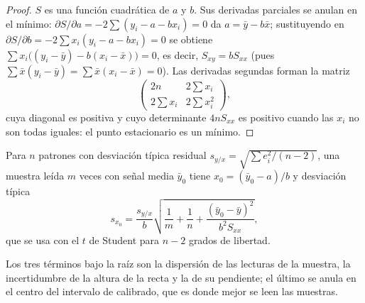 \begin{proof}
$S$ es una función cuadrática de $a$ y $b$. Sus derivadas parciales se anulan en el mínimo:
$\partial S/\partial a = -2\sum(y_i - a - bx_i) = 0$ da $a = \bar y - b\bar x$; sustituyendo en
$\partial S/\partial b = -2\sum x_i(y_i - a - bx_i) = 0$ se obtiene $\sum x_i\bigl((y_i - \bar y) - b(x_i -
\bar x)\bigr) = 0$, es decir, $S_{xy} = bS_{xx}$ (pues $\sum \bar x(y_i - \bar y) = \sum \bar x(x_i - \bar
x) = 0$). Las derivadas segundas forman la matriz
\[\begin{pmatrix} 2n & 2\sum x_i\\ 2\sum x_i & 2\sum x_i^2\end{pmatrix},\]
cuya diagonal es positiva y cuyo determinante $4nS_{xx}$ es positivo cuando las $x_i$ no son todas
iguales: el punto estacionario es un mínimo.
\end{proof}

\begin{proposition}\label{prop:b2:measurement-statistics:interpolation}
Para $n$ patrones con desviación típica residual $s_{y/x} = \sqrt{\sum e_i^2/(n-2)}$, una muestra leída
$m$ veces con señal media $\bar y_0$ tiene $x_0 = (\bar y_0 - a)/b$ y desviación típica
\begin{equation*}
s_{x_0} = \frac{s_{y/x}}{b}\sqrt{\frac1m + \frac1n + \frac{(\bar y_0 - \bar y)^2}{b^2S_{xx}}},
\end{equation*}
que se usa con el $t$ de Student para $n - 2$ grados de libertad.
\end{proposition}

\admitted

Los tres términos bajo la raíz son la dispersión de las lecturas de la muestra, la incertidumbre de la altura
de la recta y la de su pendiente; el último se anula en el centro del intervalo de calibrado, que es donde
mejor se leen las muestras.

